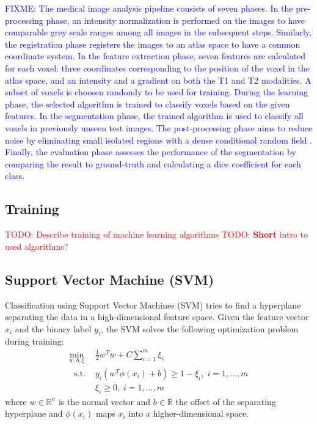 \documentclass[journal]{IEEEtran}
\newcommand\TODO[1]{\textcolor{red}{TODO: #1}}
\newcommand\FIXME[1]{\textcolor{blue}{FIXME: #1}}
\begin{document}
\FIXME{The medical image analysis pipeline consists of seven phases. In the pre-processing phase, an intensity normalization is performed on the images to have comparable grey scale ranges among all images in the subsequent steps. Similarly, the registration phase registers the images to an atlas space to have a common coordinate system. In the feature extraction phase, seven features are calculated for each voxel: three coordinates corresponding to the position of the voxel in the atlas space, and an intensity and a gradient on both the T1 and T2 modalities. A subset of voxels is choosen randomly to be used for training. During the learning phase, the selected algorithm is trained to classify voxels based on the given features. In the segmentation phase, the trained algorithm is used to classify all voxels in previously unseen test images. The post-processing phase aims to reduce noise by eliminating small isolated regions with a dense conditional random field \cite{krahenbuhl2011efficient}. Finally, the evaluation phase assesses the performance of the segmentation by comparing the result to ground-truth and calculating a dice coefficient for each class.}

\subsection{Training}
\TODO{Describe training of machine learning algorithms}
\TODO{\textbf{Short} intro to used algorithms?}

\subsection{Support Vector Machine (SVM)}
Classification using Support Vector Machines (SVM) tries to find a hyperplane separating the data in a high-dimensional feature space. Given the feature vector $x_i$ and the binary label $y_i$, the SVM solves the following optimization problem during training:
\begin{equation}
\begin{split}
\min_{w, b, \xi} \ & \frac{1}{2}w^Tw + C\sum_{i=1}^m \xi_i \\
\ \text{ s.t. } & y_i(w^T\phi(x_i)+b) \geq 1-\xi_i, \; i = 1, \ldots, m \\
& \xi_i \geq 0, \; i = 1, \ldots, m
\end{split}
\end{equation}
where $w\in \mathbb{R}^n $ is the normal vector and $b \in \mathbb{R}$ the offset of the separating hyperplane and $\phi(x_i)$ maps $x_i$ into a higher-dimensional space.
\end{document}

